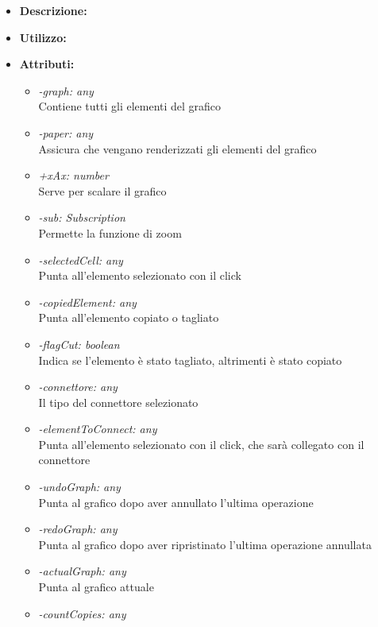 \begin{itemize}
	\item \textbf{Descrizione:}\\
	
	\item \textbf{Utilizzo:}\\
	
	\item \textbf{Attributi:}
		\begin{itemize}
			\item \emph{-graph: any}\\
            Contiene tutti gli elementi del grafico
            \item \emph{-paper: any}\\
            Assicura che vengano renderizzati gli elementi del grafico
            \item \emph{+xAx: number}\\
            Serve per scalare il grafico
            \item \emph{-sub: Subscription}\\
            Permette la funzione di zoom
            \item \emph{-selectedCell: any}\\
            Punta all'elemento selezionato con il click
            \item \emph{-copiedElement: any}\\
			Punta all'elemento copiato o tagliato
			\item \emph{-flagCut: boolean}\\
			Indica se l'elemento è stato tagliato, altrimenti è stato copiato
            \item \emph{-connettore: any}\\
            Il tipo del connettore selezionato
            \item \emph{-elementToConnect: any}\\
            Punta all'elemento selezionato con il click, che sarà collegato con il connettore
			\item \emph{-undoGraph: any}\\
			Punta al grafico dopo aver annullato l'ultima operazione
			\item \emph{-redoGraph: any}\\
			Punta al grafico dopo aver ripristinato l'ultima operazione annullata
			\item \emph{-actualGraph: any}\\
			Punta al grafico attuale
			\item \emph{-countCopies: any}\\

\end{itemize}
\end{itemize}
